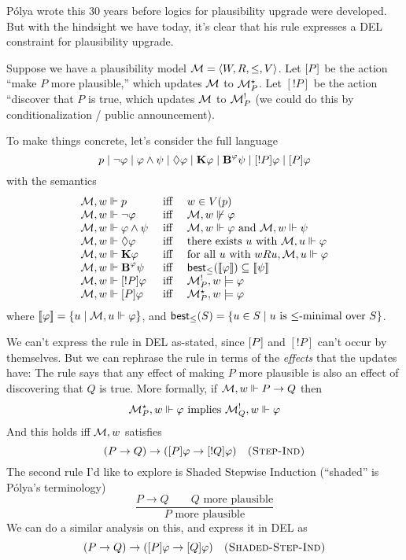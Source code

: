 \documentclass[letterpaper]{article}
\begin{document}
P\'{o}lya wrote this 30 years before logics for plausibility upgrade were developed.  But with the hindsight we have today, it's clear that his rule expresses a DEL constraint for plausibility upgrade.  

Suppose we have a plausibility model $\mathcal{M} = \langle W, R, \leq, V \rangle$.  Let $[P]$ be the action ``make $P$ more plausible,'' which updates $\mathcal{M}$ to $\mathcal{M}^{\star}_P$.  Let $[!P]$ be the action ``discover that $P$ is true, which updates $\mathcal{M}$ to $\mathcal{M}^{!}_P$ (we could do this by conditionalization / public announcement).

To make things concrete, let's consider the full language
\[
    p \mid \neg \varphi \mid \varphi \land \psi \mid \Diamond \varphi \mid \textrm{\textup{\textbf{K}}} \varphi \mid \textrm{\textup{\textbf{B}}}^{\varphi} \psi \mid [!P] \varphi \mid [P] \varphi
\]
with the semantics
\[
    \begin{array}{lcl}
        \mathcal{M}, w \Vdash p & \mbox{ iff } & w \in V(p)\\
        \mathcal{M}, w \Vdash \neg \varphi & \mbox{ iff } & \mathcal{M}, w \not \Vdash \varphi\\
        \mathcal{M}, w \Vdash \varphi \land \psi & \mbox{ iff } & \mathcal{M}, w \Vdash \varphi \mbox{ and } \mathcal{M}, w \Vdash \psi\\
        \mathcal{M}, w \Vdash \Diamond \varphi & \mbox{ iff } & \mbox{there exists } u \mbox{ with } \mathcal{M}, u \Vdash \varphi\\
        \mathcal{M}, w \Vdash \textrm{\textup{\textbf{K}}} \varphi & \mbox{ iff } & \mbox{for all } u \mbox{ with } w{R}u, \mathcal{M}, u \Vdash \varphi \\
        \mathcal{M}, w \Vdash \textrm{\textup{\textbf{B}}}^{\varphi} \psi & \mbox{ iff } & \mathsf{best}_\leq([\![\mbox{\em $ \varphi $\/}]\!]) \subseteq [\![\mbox{\em $ \psi $\/}]\!] \\
        \mathcal{M}, w \Vdash [!P] \varphi & \mbox{ iff } & \mathcal{M}^{!}_P, w \models \varphi\\
        \mathcal{M}, w \Vdash [P] \varphi & \mbox{ iff } & \mathcal{M}^\star_P, w \models \varphi
    \end{array}
\]
where $[\![\mbox{\em $ \varphi $\/}]\!] = \{ u \mid \mathcal{M}, u \Vdash \varphi \}$, and $\mathsf{best}_\leq(S) = \{ u \in S \mid u \mbox{ is } {\leq}\mbox{-minimal over } S \}$.

We can't express the rule in DEL as-stated, since $[P]$ and $[!P]$ can't occur by themselves.  But we can rephrase the rule in terms of the \emph{effects} that the updates have: The rule says that any effect of making $P$ more plausible is also an effect of discovering that $Q$ is true.  More formally, if $\mathcal{M}, w \Vdash P \to Q$ then
\[
    \mathcal{M}^{\star}_P, w \Vdash \varphi \mbox{ implies } \mathcal{M}^{!}_Q, w \Vdash \varphi
\]
And this holds iff $\mathcal{M}, w$ satisfies
\[
    (P \to Q) \to ([P] \varphi \to [!Q] \varphi) \quad \mbox{\textsc{(Step-Ind)}}
\]
The second rule I'd like to explore is Shaded Stepwise Induction (``shaded'' is P\'{o}lya's terminology)
\[
    \frac{P \to Q \quad \quad Q \mbox{ more plausible}}{P \mbox{ more plausible}}
\]
We can do a similar analysis on this, and express it in DEL as
\[
    (P \to Q) \to ([P] \varphi \to [Q] \varphi) \quad \mbox{\textsc{(Shaded-Step-Ind)}}
\]
\end{document}

